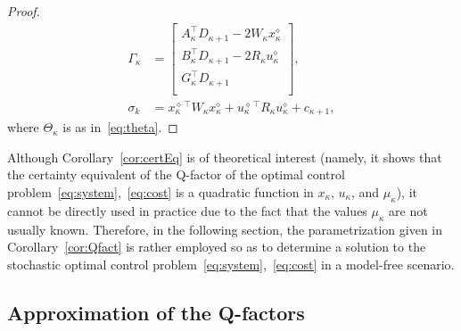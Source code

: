 \documentclass[10pt]{IEEEtran}      %
\theoremstyle{theorem}
\theoremstyle{remark}
\begin{document}
\begin{proof}
\begin{align*}
\Gamma_\kappa &= \left[\begin{array}{c}
A_\kappa^\top D_{\kappa+1} - 2 W_\kappa x_\kappa^{\diamond}\\
B_\kappa^\top  D_{\kappa+1} - 2 R_\kappa u_\kappa^{\diamond}\\
G_\kappa^\top D_{\kappa+1}\\
\end{array}\right],\\
\sigma_k & = x_\kappa^{\diamond\,\top} W_\kappa x_\kappa^{\diamond}+u_\kappa^{\diamond\,\top} R_\kappa u_\kappa^\diamond+c_{\kappa+1},
\end{align*}
where $\Theta_\kappa$ is as in~\eqref{eq:theta}. 
\end{proof}

Although Corollary~\ref{cor:certEq} is of theoretical interest (namely, it shows that the certainty equivalent
of the Q-factor of the optimal control problem~\eqref{eq:system},~\eqref{eq:cost} is a quadratic function
in $x_\kappa$, $u_\kappa$, and $\mu_\kappa$), it cannot be directly used in practice due to the fact that
the values $\mu_\kappa$ are not usually known.
Therefore, in the following section, the parametrization given in Corollary~\ref{cor:Qfact} is rather employed 
so as to determine a solution to the stochastic optimal control problem~\eqref{eq:system},~\eqref{eq:cost} in a model-free scenario.

\subsection{Approximation of the Q-factors\label{ssec:qfacappr}}
\end{document}
